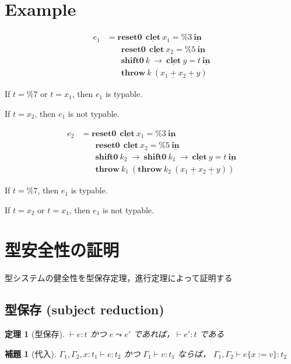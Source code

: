 \documentclass[10pt,a4j]{jarticle}
\newcommand\Resetz{\textbf{reset0}}
\newcommand\Shiftz{\textbf{shift0}}
\newcommand\Throw{\textbf{throw}}
\newcommand\cfun[2]{\underline{\lambda}{#1}.{#2}}
\newcommand\ccfun[2]{\underline{\underline{\lambda}}{#1}.{#2}}
\newcommand\cPlus{\underline{\textbf{+}}}
\newcommand\cLet{\underline{\textbf{clet}}}
\newcommand\cIn{\underline{\textbf{in}}}
\newcommand\csp[1]{\texttt{\%}{#1}}
\newcommand\code[1]{\texttt{<}{#1}\texttt{>}}
\newcommand\lto{\leadsto}
\theoremstyle{break}
\newtheorem{theo}{定理}[section]
\newtheorem{lemm}{補題}[section]
\begin{document}
\section{Example}

\begin{align*}
  e_1 & = \Resetz ~~\cLet~x_1=\csp{3}~\cIn \\
      & \phantom{=}~~ \Resetz ~~\cLet~x_2=\csp{5}~\cIn \\
      & \phantom{=}~~ \Shiftz~k~\to~\cLet~y=t~\cIn \\
      & \phantom{=}~~ \Throw~k~(x_1~\cPlus~x_2~\cPlus~y)
\end{align*}

If $t=\csp{7}$ or $t=x_1$, then $e_1$ is typable.

If $t=x_2$, then $e_1$ is not typable.

\begin{align*}
  e_2 & = \Resetz ~~\cLet~x_1=\csp{3}~\cIn \\
      & \phantom{=}~~ \Resetz ~~\cLet~x_2=\csp{5}~\cIn \\
      & \phantom{=}~~ \Shiftz~k_2~\to~ \Shiftz~k_1~\to~ \cLet~y=t~\cIn \\
      & \phantom{=}~~ \Throw~k_1~(\Throw~k_2~(x_1~\cPlus~x_2~\cPlus~y))
\end{align*}

If $t=\csp{7}$, then $e_1$ is typable.

If $t=x_2$ or $t=x_1$, then $e_1$ is not typable.

\section{型安全性の証明}
型システムの健全性を型保存定理，進行定理によって証明する

\subsection{型保存 (subject reduction)}
\begin{theo}[型保存]
  $\vdash e:t$ かつ $e \lto e'$ であれば，$\vdash e':t$ である
\end{theo}

\begin{lemm}[代入]
  $\Gamma_1, \Gamma_2, x : t_1 \vdash e : t_2 $
  かつ
  $\Gamma_1 \vdash v : t_1 $
  ならば，
  $\Gamma_1, \Gamma_2 \vdash e\{x := v\} : t_2$
\end{lemm}

\end{document}

